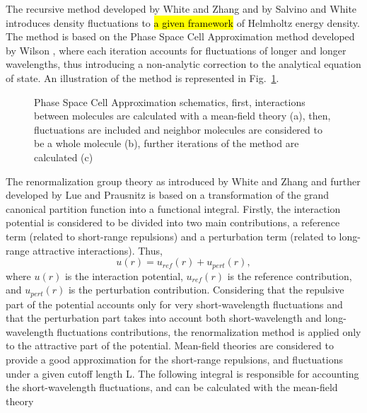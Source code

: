 \documentclass[preprint,12pt,3p]{elsarticle}
\begin{document}
	The recursive method developed by White and Zhang \cite{white1993renormalization, white1995renormalization, white1998renormalization} and by Salvino and White \cite{salvino1992calculation} introduces density fluctuations to \hl{a given framework}  of Helmholtz energy density. The method is based on the Phase Space Cell Approximation method developed by Wilson \cite{wilson1971renormalization,  wilson1971brenormalization}, where each iteration accounts for fluctuations of longer and longer wavelengths, thus introducing a non-analytic correction to the analytical equation of state. An illustration of the method is represented in Fig.~\ref{fig:schematics}.

\begin{figure}[h!]
\centering
\captionsetup{justification=centering}
\caption{Phase Space Cell Approximation schematics, first, interactions between molecules are calculated with a mean-field theory (a), then, fluctuations are included and neighbor molecules are considered to be a whole molecule (b), further iterations of the method are calculated (c)}
\label{fig:schematics}
\end{figure}
    
	The renormalization group theory as introduced by White and Zhang \cite{white1993renormalization} and further developed by Lue and Prausnitz \cite{lue1998renormalization,lue1998brenormalization} is based on a transformation of the grand canonical partition function into a functional integral. Firstly, the interaction potential is considered to be divided into two main contributions, a reference term (related to short-range repulsions) and a perturbation term (related to long-range attractive interactions). Thus,
\begin{equation} \label{eq:u(r)}
    u(r) = u_{ref}(r) + u_{pert}(r),
\end{equation}
    where $u(r)$ is the interaction potential, $u_{ref}(r)$ is the reference contribution, and $u_{pert}(r)$ is the perturbation contribution. Considering that the repulsive part of the potential accounts only for very short-wavelength fluctuations and that the perturbation part takes into account both short-wavelength and long-wavelength fluctuations contributions, the renormalization method is applied only to the attractive part of the potential. Mean-field theories are considered to provide a good approximation for the short-range repulsions, and fluctuations under a given cutoff length L. The following integral is responsible for accounting the short-wavelength fluctuations, and can be calculated with the mean-field theory
	
\end{document}
